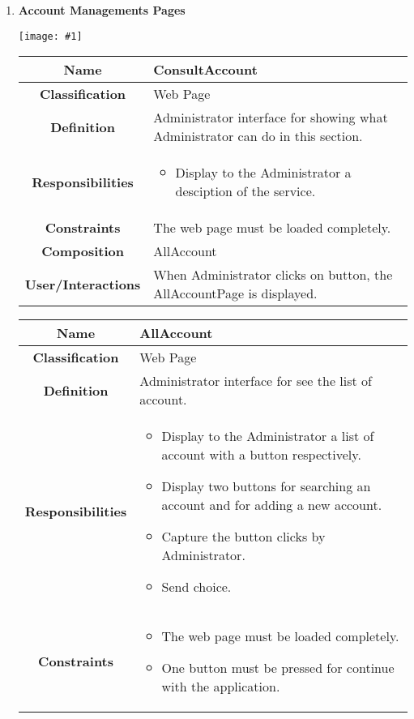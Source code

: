 \documentclass[11pt, a4paper,titlepage]{article}
\newcommand{\image}[1]{
	\begin{center}
		\noindent \texttt{[image: \#1]}
	\end{center}
	}
\begin{document}
\begin{enumerate}
\newpage
\item \textbf{Account Managements Pages}\\
\image{page_accountmanagement.png}
\begin{tabularx}{\textwidth}{| c | X |}
	\hline
	\textbf{Name} &
	ConsultAccount
	\\
	\hline
	\textbf{Classification} &
	Web Page
	\\
	\hline
	\textbf{Definition} &
	Administrator interface for showing what Administrator can do in this section.\\
	\hline
	\textbf{Responsibilities} &
	\begin{itemize}
		\item Display to the Administrator a desciption of the service.
	\end{itemize}
	\\
	\hline
	\textbf{Constraints} & The web page must be loaded completely.
	\\
	\hline
	\textbf{Composition} &
	AllAccount
	\\
	\hline
	\textbf{User/Interactions} &
	When Administrator clicks on button, the AllAccountPage is displayed.
	\\
	\hline 
\end{tabularx}
\begin{tabularx}{\textwidth}{| c | X |}
	\hline
	\textbf{Name} &
	AllAccount
	\\
	\hline
	\textbf{Classification} &
	Web Page
	\\
	\hline
	\textbf{Definition} &
	Administrator interface for see the list of account.\\
	\hline
	\textbf{Responsibilities} &
	\begin{itemize}
		\item Display to the Administrator a list of account with a button respectively.
		\item Display two buttons for searching an account and for adding a new account.
		\item  Capture the button clicks by Administrator.
		\item Send choice.
	\end{itemize}
	\\
	\hline
	\textbf{Constraints} &
	\begin{itemize}
		\item  The web page must be loaded completely.
		\item One button must be pressed for continue with the application.
	\end{itemize}

\end{tabularx}
\end{enumerate}
\end{document}
